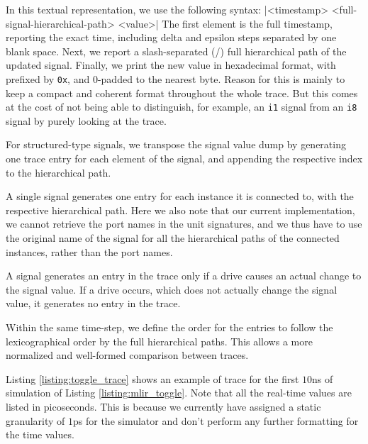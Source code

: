 In this textual representation, we use the following syntax:
|<timestamp>  <full-signal-hierarchical-path>  <value>|
\noindent The first element is the full timestamp, reporting the exact time, including delta and epsilon steps separated by one blank space. Next, we report a slash-separated (/) full hierarchical path of the updated signal.
Finally, we print the new value in hexadecimal format, with prefixed by \texttt{0x}, and $0$-padded to the nearest byte. Reason for this is mainly to keep a compact and coherent format throughout the whole trace. But this comes at the cost of not being able to distinguish, for example, an \texttt{i1} signal from an \texttt{i8} signal by purely looking at the trace.

For structured-type signals, we transpose the signal value dump by generating one trace entry for each element of the signal, and appending the respective index to the hierarchical path.

A single signal generates one entry for each instance it is connected to, with the respective hierarchical path. Here we also note that our current implementation, we cannot retrieve the port names in the unit signatures, and we thus have  to use the original name of the signal for all the hierarchical paths of the connected instances, rather than the port names.

A signal generates an entry in the trace only if a drive causes an actual change to the signal value. If a drive occurs, which does not actually change the signal value, it generates no entry in the trace.

Within the same time-step, we define the order for the entries to follow the lexicographical order by the full hierarchical paths. This allows a more normalized and well-formed comparison between traces.

Listing \ref{listing:toggle_trace} shows an example of trace for the first $10$ns of simulation of Listing \ref{listing:mlir_toggle}. Note that all the real-time values are listed in picoseconds. This is because we currently have assigned a static granularity of $1$ps for the simulator and don't perform any further formatting for the time values.

